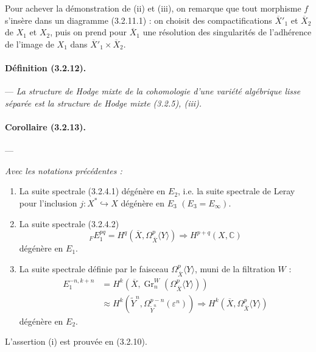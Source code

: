 \documentclass[10pt]{article}
\newcommand{\C}{\mathbb C}
\newcommand{\Gr}{\operatorname{Gr}}
\begin{document}
Pour achever la démonstration de (ii) et (iii), on remarque que tout morphisme $f$ s'insère dans un diagramme (3.2.11.1) : on choisit des compactifications $\overline X'_1$ et $\overline X_2$ de $X_1$ et $X_2$, puis on prend pour $\overline X_1$ une résolution des singularités de l'adhérence de l'image de $X_1$ dans $\overline X'_1\times\overline X_2$.

\paragraph{Définition (3.2.12).} --- {\itshape La structure de Hodge mixte de la cohomologie d'une variété algébrique lisse séparée est la structure de Hodge mixte (3.2.5), (iii).}

\paragraph{Corollaire (3.2.13).} --- {\itshape Avec les notations précédentes :
\begin{enumerate}[label=(\roman*)]
\item La suite spectrale (3.2.4.1) dégénère en $E_2$, i.e. la suite spectrale de Leray pour l'inclusion $j:X^*\hookrightarrow X$ dégénère en $E_3$ $(E_3=E_\infty)$.
\item La suite spectrale (3.2.4.2)
\[
{}_F E_1^{pq}=H^q(\overline X,\Omega_{\overline X}^p\langle Y\rangle)
\Longrightarrow H^{p+q}(X,\C)
\]
dégénère en $E_1$.
\item La suite spectrale définie par le faisceau $\Omega_{\overline X}^{p}\langle Y\rangle$, muni de la filtration $W$ :
\[
\begin{aligned}
E_1^{-n,k+n}
&=H^k(\overline X,\Gr_n^W(\Omega_{\overline X}^{p}\langle Y\rangle))\\
&\approx H^k(\widetilde Y^n,\Omega_{\widetilde Y^n}^{p-n}(\varepsilon^n))
\Longrightarrow H^k(\overline X,\Omega_{\overline X}^{p}\langle Y\rangle)
\end{aligned}
\]
dégénère en $E_2$.
\end{enumerate}}

L'assertion (i) est prouvée en (3.2.10).
\end{document}
